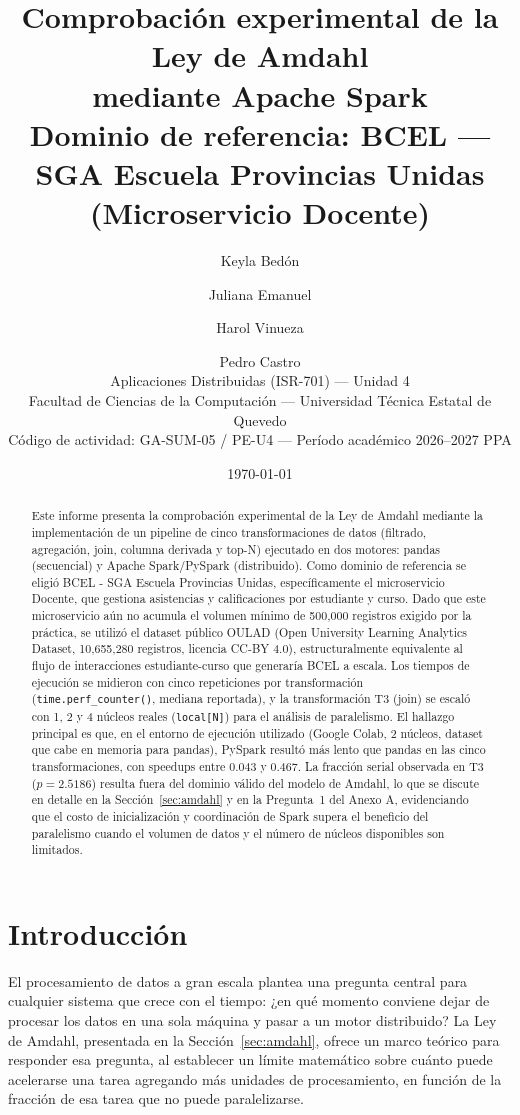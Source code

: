 \documentclass[11pt,a4paper]{article}
\title{Comprobación experimental de la Ley de Amdahl \\ mediante Apache Spark \\
\large Dominio de referencia: BCEL --- SGA Escuela Provincias Unidas \\
(Microservicio Docente)}
\author{
Keyla Bedón \and Juliana Emanuel \and Harol Vinueza \and Pedro Castro \\
\small Aplicaciones Distribuidas (ISR-701) --- Unidad 4 \\
\small Facultad de Ciencias de la Computación --- Universidad Técnica Estatal de Quevedo \\
\small Código de actividad: GA-SUM-05 / PE-U4 --- Período académico 2026--2027 PPA
}
\date{\today}
\begin{document}
\maketitle

\begin{abstract}
Este informe presenta la comprobación experimental de la Ley de Amdahl mediante
la implementación de un pipeline de cinco transformaciones de datos (filtrado,
agregación, join, columna derivada y top-N) ejecutado en dos motores: pandas
(secuencial) y Apache Spark/PySpark (distribuido). Como dominio de referencia
se eligió BCEL - SGA Escuela Provincias Unidas, específicamente el
microservicio Docente, que gestiona asistencias y calificaciones por
estudiante y curso. Dado que este microservicio aún no acumula el volumen
mínimo de 500{,}000 registros exigido por la práctica, se utilizó el dataset
público OULAD (Open University Learning Analytics Dataset, 10{,}655{,}280
registros, licencia CC-BY 4.0), estructuralmente equivalente al flujo de
interacciones estudiante-curso que generaría BCEL a escala. Los tiempos de
ejecución se midieron con cinco repeticiones por transformación
(\texttt{time.perf\_counter()}, mediana reportada), y la transformación T3
(join) se escaló con 1, 2 y 4 núcleos reales (\texttt{local[N]}) para el
análisis de paralelismo. El hallazgo principal es que, en el entorno de
ejecución utilizado (Google Colab, 2 núcleos, dataset que cabe en memoria
para pandas), PySpark resultó más lento que pandas en las cinco
transformaciones, con speedups entre 0.043 y 0.467. La fracción serial
observada en T3 ($p=2.5186$) resulta fuera del dominio válido del modelo de
Amdahl, lo que se discute en detalle en la Sección~\ref{sec:amdahl} y en la
Pregunta~1 del Anexo A, evidenciando que el costo de inicialización y
coordinación de Spark supera el beneficio del paralelismo cuando el volumen
de datos y el número de núcleos disponibles son limitados.
\end{abstract}

\tableofcontents
\newpage

\section{Introducción}
El procesamiento de datos a gran escala plantea una pregunta central para
cualquier sistema que crece con el tiempo: ¿en qué momento conviene dejar de
procesar los datos en una sola máquina y pasar a un motor distribuido? La Ley
de Amdahl, presentada en la Sección~\ref{sec:amdahl}, ofrece un marco teórico
para responder esa pregunta, al establecer un límite matemático sobre cuánto
puede acelerarse una tarea agregando más unidades de procesamiento, en función
de la fracción de esa tarea que no puede paralelizarse.
\end{document}
